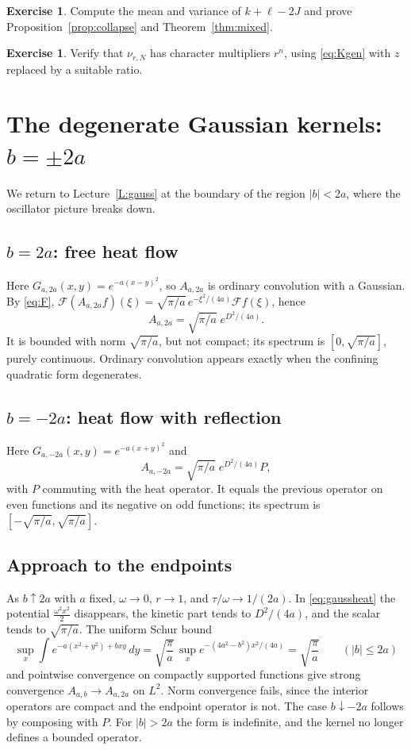 \documentclass[11pt,reqno]{amsart}
\theoremstyle{definition}
\newtheorem{exercise}[theorem]{Exercise}
\theoremstyle{remark}
\newcommand{\F}{\mathcal F}
\begin{document}
\begin{exercise}
Compute the mean and variance of $k+\ell-2J$ and prove
Proposition~\ref{prop:collapse} and Theorem~\ref{thm:mixed}.
\end{exercise}
\begin{exercise}
Verify that $\nu_{r,N}$ has character multipliers $r^n$, using
\eqref{eq:Kgen} with $z$ replaced by a suitable ratio.
\end{exercise}

\section{The degenerate Gaussian kernels: $b=\pm2a$}\label{L:end}
We return to Lecture~\ref{L:gauss} at the boundary of the region
$|b|<2a$, where the oscillator picture breaks down.

\subsection{$b=2a$: free heat flow}
Here $G_{a,2a}(x,y)=e^{-a(x-y)^2}$, so $A_{a,2a}$ is ordinary convolution
with a Gaussian. By \eqref{eq:F},
$\F(A_{a,2a}f)(\xi)=\sqrt{\pi/a}\,e^{-\xi^2/(4a)}\F f(\xi)$, hence
\[
A_{a,2a}=\sqrt{\pi/a}\;e^{D^2/(4a)}.
\]
It is bounded with norm $\sqrt{\pi/a}$, but not compact; its spectrum is
$[0,\sqrt{\pi/a}]$, purely continuous. Ordinary convolution appears
exactly when the confining quadratic form degenerates.

\subsection{$b=-2a$: heat flow with reflection}
Here $G_{a,-2a}(x,y)=e^{-a(x+y)^2}$ and
\[
A_{a,-2a}=\sqrt{\pi/a}\;e^{D^2/(4a)}P,
\]
with $P$ commuting with the heat operator. It equals the previous
operator on even functions and its negative on odd functions; its
spectrum is $[-\sqrt{\pi/a},\sqrt{\pi/a}]$.

\subsection{Approach to the endpoints}
As $b\uparrow2a$ with $a$ fixed, $\omega\to0$, $r\to1$, and
$\tau/\omega\to1/(2a)$. In \eqref{eq:gaussheat} the potential
$\frac{\omega^2x^2}{2}$ disappears, the kinetic part tends to
$D^2/(4a)$, and the scalar tends to $\sqrt{\pi/a}$. The uniform Schur
bound
\[
\sup_x\int e^{-a(x^2+y^2)+bxy}\,dy=\sqrt{\frac\pi a}\,
\sup_xe^{-(4a^2-b^2)x^2/(4a)}=\sqrt{\frac\pi a}\qquad(|b|\le2a)
\]
and pointwise convergence on compactly supported functions give strong
convergence $A_{a,b}\to A_{a,2a}$ on $L^2$. Norm convergence fails,
since the interior operators are compact and the endpoint operator is
not. The case $b\downarrow-2a$ follows by composing with $P$. For
$|b|>2a$ the form is indefinite, and the kernel no longer defines a
bounded operator.
\end{document}
